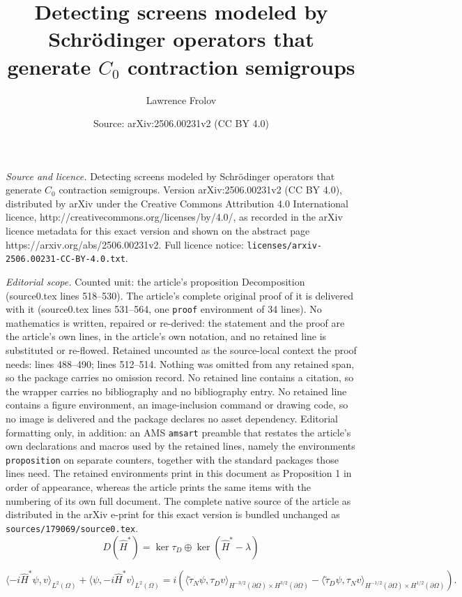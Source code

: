 \documentclass[10pt,a4paper]{amsart}
\title{Detecting screens modeled by Schr\"odinger operators that generate $C_0$ contraction semigroups}
\author{Lawrence Frolov}
\date{Source: arXiv:2506.00231v2 (CC BY 4.0)}
\begin{document}
\maketitle

\noindent\emph{Source and licence.} Detecting screens modeled by Schr\"odinger operators that generate $C_0$ contraction semigroups. Version arXiv:2506.00231v2 (CC BY 4.0), distributed by arXiv under the Creative Commons Attribution 4.0 International licence, http://creativecommons.org/licenses/by/4.0/, as recorded in the arXiv licence metadata for this exact version and shown on the abstract page https://arxiv.org/abs/2506.00231v2. Full licence notice: \texttt{licenses/arxiv-2506.00231-CC-BY-4.0.txt}.\par\smallskip

\noindent\textit{Editorial scope.} Counted unit: the article's proposition Decomposition (source0.tex lines 518--530). The article's complete original proof of it is delivered with it (source0.tex lines 531--564, one \texttt{proof} environment of 34 lines). No mathematics is written, repaired or re-derived: the statement and the proof are the article's own lines, in the article's own notation, and no retained line is substituted or re-flowed.  Retained uncounted as the source-local context the proof needs: lines 488--490; lines 512--514.  Nothing was omitted from any retained span, so the package carries no omission record.  No retained line contains a citation, so the wrapper carries no bibliography and no bibliography entry.  No retained line contains a figure environment, an image-inclusion command or drawing code, so no image is delivered and the package declares no asset dependency.  Editorial formatting only, in addition: an AMS \texttt{amsart} preamble that restates the article's own declarations and macros used by the retained lines, namely the environments \texttt{proposition} on separate counters, together with the standard packages those lines need.  The retained environments print in this document as Proposition 1 in order of appearance, whereas the article prints the same items with the numbering of its own full document.  The complete native source of the article as distributed in the arXiv e-print for this exact version is bundled unchanged as \texttt{sources/179069/source0.tex}.
    \begin{equation}\label{Dirichlet Star Decomp}
        D(\hat{H}^*)= \ker \tau_D \oplus \ker(\hat{H}^*-\lambda)
    \end{equation}

    \begin{equation}\label{Green's Identity Star}
        \langle -i\hat{H}^*\psi,v\rangle_{L^2(\Omega)}+ \langle \psi,-i\hat{H}^*v \rangle_{L^2(\Omega)}=i\left( \langle \tilde{\tau}_N \psi, \tau_D v\rangle_{H^{-3/2}(\partial \Omega)\times H^{3/2}(\partial \Omega)} -\langle  \tilde{\tau}_D \psi, \tau_N v\rangle_{H^{-1/2}(\partial \Omega)\times H^{1/2}(\partial \Omega)}\right).
    \end{equation}
\end{document}
